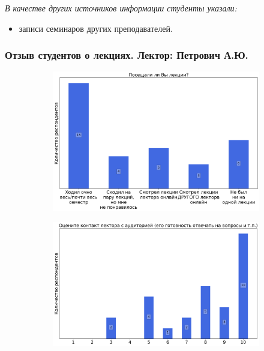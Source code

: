 		\textit{В качестве других источников информации студенты указали:} 
		\begin{itemize}
            \item записи семинаров других преподавателей.
		\end{itemize}

	\subsubsection{Отзыв студентов о лекциях. Лектор: Петрович А.Ю.}

		\begin{figure}[H]
			\centering
            \begin{subfigure}[b]{0.45\textwidth}
				\centering
				\includegraphics[width=\textwidth]{images/2 course/Кратные интегралы и теория поля/lecturer-questions-Петрович А.Ю.-0.png}
			\end{subfigure}
			\begin{subfigure}[b]{0.45\textwidth}
				\centering
				\includegraphics[width=\textwidth]{images/2 course/Кратные интегралы и теория поля/lecturer-marks-Петрович А.Ю.-0.png}

\end{subfigure}
\end{figure}
